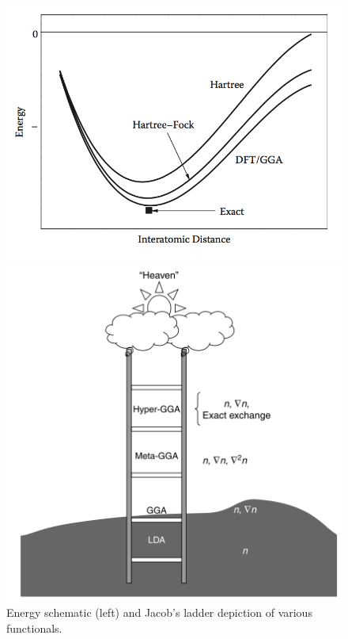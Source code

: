 \documentclass[3p,review,12pt]{elsarticle}
\begin{document}
\begin{figure}[H]
	\centering
	\begin{minipage}[b]{0.45\textwidth}
		\includegraphics[width=\textwidth]{lee1}
	\end{minipage}
	\hfill
	\begin{minipage}[b]{0.45\textwidth}
		\includegraphics[width=\textwidth]{sholl1}
		\centering
	\end{minipage}
	\caption{Energy schematic \cite{Lee2012} (left) and Jacob's ladder depiction \cite{Sholl2009} of various functionals.}
\end{figure}
\end{document}
